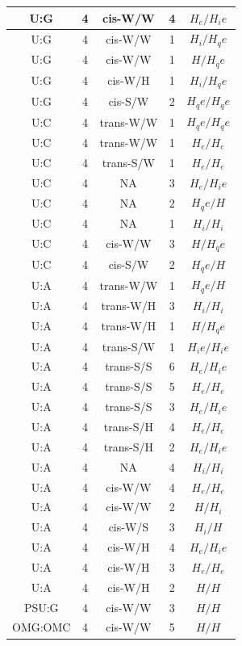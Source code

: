 \begin{center}
\begin{longtable}{c|c|c|c|c}
U:G & 4 & cis-W/W & 4 & $H_e/H_ie$ \\  \hline
U:G & 4 & cis-W/W & 1 & $H_i/H_qe$ \\  \hline
U:G & 4 & cis-W/W & 1 & $H/H_qe$ \\  \hline
U:G & 4 & cis-W/H & 1 & $H_i/H_qe$ \\  \hline
U:G & 4 & cis-S/W & 2 & $H_qe/H_qe$ \\  \hline
U:C & 4 & trans-W/W & 1 & $H_qe/H_qe$ \\  \hline
U:C & 4 & trans-W/W & 1 & $H_e/H_e$ \\  \hline
U:C & 4 & trans-S/W & 1 & $H_e/H_e$ \\  \hline
U:C & 4 & NA & 3 & $H_e/H_ie$ \\  \hline
U:C & 4 & NA & 2 & $H_qe/H$ \\  \hline
U:C & 4 & NA & 1 & $H_i/H_i$ \\  \hline
U:C & 4 & cis-W/W & 3 & $H/H_qe$ \\  \hline
U:C & 4 & cis-S/W & 2 & $H_qe/H$ \\  \hline
U:A & 4 & trans-W/W & 1 & $H_qe/H$ \\  \hline
U:A & 4 & trans-W/H & 3 & $H_i/H_i$ \\  \hline
U:A & 4 & trans-W/H & 1 & $H/H_qe$ \\  \hline
U:A & 4 & trans-S/W & 1 & $H_ie/H_ie$ \\  \hline
U:A & 4 & trans-S/S & 6 & $H_e/H_ie$ \\  \hline
U:A & 4 & trans-S/S & 5 & $H_e/H_e$ \\  \hline
U:A & 4 & trans-S/S & 3 & $H_e/H_ie$ \\  \hline
U:A & 4 & trans-S/H & 4 & $H_e/H_e$ \\  \hline
U:A & 4 & trans-S/H & 2 & $H_e/H_ie$ \\  \hline
U:A & 4 & NA & 4 & $H_i/H_i$ \\  \hline
U:A & 4 & cis-W/W & 4 & $H_e/H_e$ \\  \hline
U:A & 4 & cis-W/W & 2 & $H/H_i$ \\  \hline
U:A & 4 & cis-W/S & 3 & $H_i/H$ \\  \hline
U:A & 4 & cis-W/H & 4 & $H_e/H_ie$ \\  \hline
U:A & 4 & cis-W/H & 3 & $H_e/H_e$ \\  \hline
U:A & 4 & cis-W/H & 2 & $H/H$ \\  \hline
PSU:G & 4 & cis-W/W & 3 & $H/H$ \\  \hline
OMG:OMC & 4 & cis-W/W & 5 & $H/H$ \\  \hline

\end{longtable}
\end{center}
